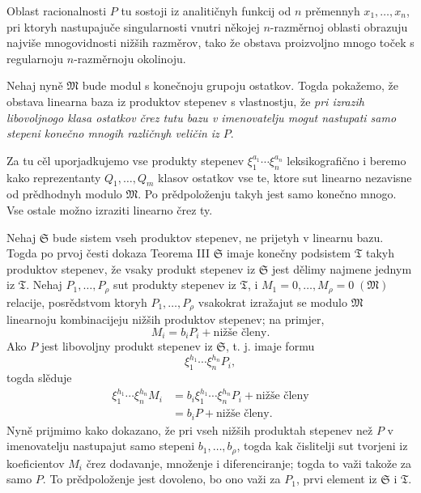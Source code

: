 \documentclass[11pt]{article}
\begin{document}
Oblast racionalnosti \(P\) tu sostoji iz analitičnyh funkcij od \(n\) prěmennyh \(x_1,
\ldots,x_n\), pri ktoryh nastupajuče singularnosti vnutri někojej \(n\)-razměrnoj oblasti obrazuju najviše mnogovidnosti nižših razměrov, tako že obstava proizvoljno mnogo toček s regularnoju \(n\)-razměrnoju okolinoju.

Nehaj nyně \(\mathfrak M\) bude modul s konečnoju grupoju ostatkov. Togda pokažemo, že obstava linearna baza iz produktov stepenev s vlastnostju, že \textit{pri izrazih libovoljnogo klasa ostatkov črez tutu bazu v imenovatelju mogut nastupati samo stepeni konečno mnogih različnyh veličin iz \(P\)}.

Za tu cěl uporjadkujemo vse produkty stepenev \(\xi_1^{a_1}\cdots\xi_n^{a_n}\) leksikografično i beremo kako reprezentanty \(Q_1,
\ldots,Q_m\) klasov ostatkov vse te, ktore sut linearno nezavisne od prědhodnyh modulo \(\mathfrak M\). Po prědpoloženju takyh jest samo konečno mnogo. Vse ostale možno izraziti linearno črez ty.

Nehaj \(\mathfrak S\) bude sistem vseh produktov stepenev, ne prijetyh v linearnu bazu. Togda po prvoj česti dokaza Teorema III \(\mathfrak S\) imaje konečny podsistem \(\mathfrak T\) takyh produktov stepenev, že vsaky produkt stepenev iz \(\mathfrak S\) jest dělimy najmene jednym iz \(\mathfrak T\). Nehaj \(P_1,
\ldots,P_\rho\) sut produkty stepenev iz \(\mathfrak T\), i \(M_1=0,
\ldots,M_\rho=0\;(\mathfrak M)\) relacije, posrědstvom ktoryh \(P_1,
\ldots,P_\rho\) vsakokrat izražajut se modulo \(\mathfrak M\) linearnoju kombinacijeju nižših produktov stepenev; na primjer,
\[
 M_i=b_iP_i+\text{nižše členy}.
\]
Ako \(P\) jest libovoljny produkt stepenev iz \(\mathfrak S\), t. j. imaje formu
\[
 \xi_1^{h_1}\cdots\xi_n^{h_n}P_i,
\]
togda slěduje
\[
\begin{aligned}
 \xi_1^{h_1}\cdots\xi_n^{h_n}M_i
 &=b_i\xi_1^{h_1}\cdots\xi_n^{h_n}P_i+\text{nižše členy}\\
 &=b_iP+\text{nižše členy}.
\end{aligned}
\]
Nyně prijmimo kako dokazano, že pri vseh nižših produktah stepenev než \(P\) v imenovatelju nastupajut samo stepeni \(b_1,
\ldots,b_\rho\), togda kak čislitelji sut tvorjeni iz koeficientov \(M_i\) črez dodavanje, množenje i diferenciranje; togda to važi takože za samo \(P\). To prědpoloženje jest dovoleno, bo ono važi za \(P_1\), prvi element iz \(\mathfrak S\) i \(\mathfrak T\).
\end{document}
